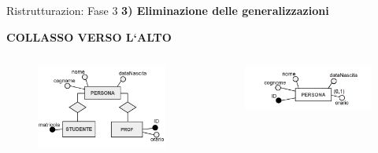%
\begin{frame}{Ristrutturazion: Fase 3}
\textbf{3) Eliminazione delle generalizzazioni}
\\\vspace{2em}
\begin{center}
    \textbf{COLLASSO VERSO L`ALTO}
\end{center}
\begin{columns}
        \begin{column}{0.5\textwidth}
            \begin{figure}[h]
        \centering
        \includegraphics[width=1\textwidth]{img/i6.png}
    \end{figure}
        \end{column}
        \begin{column}{0.5\textwidth}
            \begin{figure}[h]
        \centering
        \includegraphics[width=1\textwidth]{img/i8.png}
    \end{figure}
        \end{column}
    \end{columns}
\end{frame}
%
